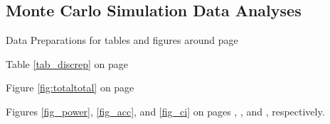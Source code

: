 \documentclass[]{DissertateCUNY}
\begin{document}
\normalsize

\clearpage

\subsection*{Monte Carlo Simulation Data
Analyses}\label{monte-carlo-simulation-data-analyses}

Data Preparations for tables and figures around page
\pageref{tab_discrep}

\small

\normalsize

Table \ref{tab_discrep} on page \pageref{tab_discrep}

\small

\normalsize

Figure \ref{fig:totaltotal} on page \pageref{fig:totaltotal}

\small

\normalsize

Figures \ref{fig_power}, \ref{fig_acc}, and \ref{fig_ci} on pages
\pageref{fig_power}, \pageref{fig_acc}, and \pageref{fig_ci},
respectively.

\small

\normalsize
\end{document}

